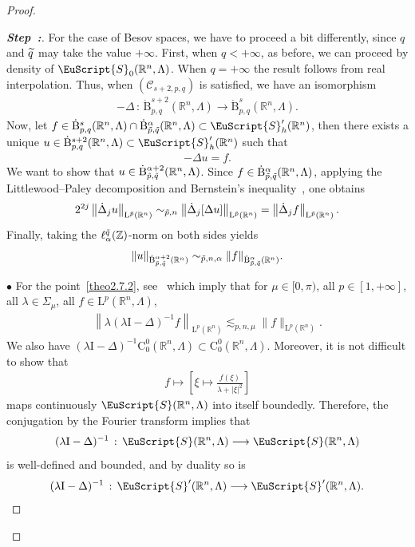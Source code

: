 \documentclass[AHL,Unicode,longabstracts,published]{cedram}
\newcommand{\bbR}{\mathbb{R}}
\newcommand{\bbZ}{\mathbb{Z}}
\newcommand{\rmB}{\mathrm{B}}
\newcommand{\rmL}{\mathrm{L}}
\newcommand{\rmC}{\mathrm{C}}
\newcommand{\rmI}{\mathrm{I}}
\newcommand{\clC}{\mathcal{C}}
\newcommand{\eus}{\EuScript}
\newcounter{stepcount}
\newenvironment{step}{\refstepcounter{stepcount}\begin{proof}[\textbf{Step~\thestepcount:}]}{\let\qed\relax\end{proof}}
\let\oldtilde\tilde
\renewcommand*{\tilde}[1]{\mathchoice{\widetilde{#1}}{\widetilde{#1}}{\oldtilde{#1}}{\oldtilde{#1}}}
\begin{document}
\begin{proof}
\begin{step}
For the case of Besov spaces, we have to proceed a bit differently, since $q$ and $\tilde{q}$ may take the value $+\infty$. First, when $q<+\infty$, as before, we can proceed by density of $\eus{S}_0(\bbR^n,\Lambda)$. When $q=+\infty$ the result follows from real interpolation. Thus, when $(\clC_{s+2,p,q})$ is satisfied, we have an isomorphism
\begin{align*}
-\Delta\,:\,\dot{\rmB}^{s+2}_{p,q}(\bbR^n,\Lambda)\longrightarrow\dot{\rmB}^{s}_{p,q}(\bbR^n,\Lambda).
\end{align*}
Now, let $f\in\dot{\rmB}^{s}_{p,q}(\bbR^n,\Lambda)\cap \dot{\rmB}^{\alpha}_{\tilde{p},\tilde{q}}(\bbR^n,\Lambda)\subset \eus{S}'_h(\bbR^n)$, then there exists a unique $u\in\dot{\rmB}^{s+2}_{p,q}(\bbR^n,\Lambda)\subset \eus{S}'_h(\bbR^n)$ such that
\begin{align*}
-\Delta u = f.
\end{align*}
We want to show that $u\in \dot{\rmB}^{\alpha+2}_{\tilde{p},\tilde{q}}(\bbR^n,\Lambda)$. Since $f\in \dot{\rmB}^{\alpha}_{\tilde{p},\tilde{q}}(\bbR^n,\Lambda)$, applying the Littlewood--Paley decomposition and Bernstein's inequality~\cite[Lemma~2.1]{bookBahouriCheminDanchin}, one obtains
\begin{align*}
2^{2j}\left\| \dot{\Delta}_j u\right\|_{\rmL^{\tilde{p}}(\bbR^n)}\sim_{\tilde{p},n} \left\| \dot{\Delta}_j [\Delta u]\right\|_{\rmL^{\tilde{p}}(\bbR^n)} = \left\| \dot{\Delta}_j f\right\|_{\rmL^{\tilde{p}}(\bbR^n)}.
\end{align*}
Finally, taking the $\ell_{\alpha}^{\tilde{q}}(\bbZ)$-norm on both sides yields
\begin{align*}
\| u\|_{\dot{\rmB}^{\alpha+2}_{\tilde{p},\tilde{q}}(\bbR^n)} \sim_{\tilde{p},n,\alpha} \| f\|_{\dot{\rmB}^{\alpha}_{\tilde{p},\tilde{q}}(\bbR^n)}.
\end{align*}

$\bullet$ For the point~\eqref{theo2.7.2}, see~\cite[Example~3.7.6,~Theorem~3.7.11]{ArendtBattyHieberNeubranker2011} which imply that for $\mu\in[0,\pi)$, all $p\in[1,+\infty]$, all $\lambda\in\Sigma_\mu$, all $f\in\rmL^p(\bbR^n,\Lambda)$,
\begin{align*}
\left\| \lambda (\lambda\rmI -\Delta)^{-1}f\right\|_{\rmL^p(\bbR^n)}\lesssim_{p,n,\mu} \| f\|_{\rmL^p(\bbR^n)}.
\end{align*}
We also have $(\lambda\rmI -\Delta)^{-1}\rmC^0_0(\bbR^n,\Lambda)\subset\rmC^0_0(\bbR^n,\Lambda)$. Moreover, it is not difficult to show that
\begin{align*}
f\longmapsto \left[\xi\mapsto \frac{f(\xi)}{\lambda+|\xi|^2}\right]
\end{align*}
maps continuously $\eus{S}(\bbR^n,\Lambda)$ into itself boundedly. Therefore, the conjugation by the Fourier transform implies that
\begin{align*}
(\lambda\rmI -\Delta)^{-1}\,:\,\eus{S}(\bbR^n,\Lambda)\longrightarrow \eus{S}(\bbR^n,\Lambda)
\end{align*}
is well-defined and bounded, and by duality so is
\begin{align*}
(\lambda\rmI -\Delta)^{-1}\,:\,\eus{S}'(\bbR^n,\Lambda)\longrightarrow \eus{S}'(\bbR^n,\Lambda).
\end{align*}


\end{step}
\end{proof}
\end{document}
